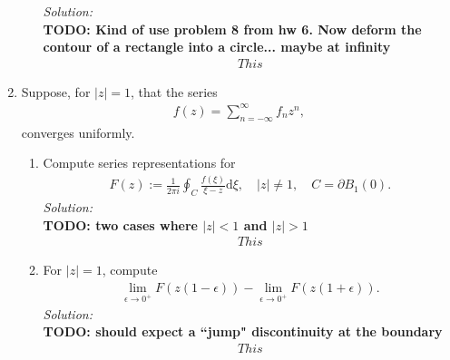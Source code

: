 \documentclass[10pt]{amsart}
\newcommand{\D}{\mathrm{d}}
\theoremstyle{nonumberplain}
\begin{document}
\begin{enumerate}[label={\bf {\arabic*}:}]
\begin{enumerate}
\noindent
\textit{Solution:} \\
\textbf{TODO: Kind of use problem 8 from hw 6. Now deform the contour of a rectangle into a circle... maybe at infinity}
\begin{align*}
This
\end{align*}
\end{enumerate}
\newpage

\item Suppose, for $|z| = 1$, that the series
\begin{align*}
f(z) = \sum_{n = -\infty}^\infty f_n z^n,
\end{align*}
converges uniformly.
\begin{enumerate}
\item Compute series representations for
\begin{align*}
F(z) := \frac{1}{2 \pi i} \oint_{C} \frac{f(\xi)}{\xi - z} \D \xi,
\quad |z| \neq 1, \quad C = \partial B_1(0).
\end{align*}
\textit{Solution:} \\
\textbf{TODO: two cases where $|z| < 1$ and $|z| > 1$}
\begin{align*}
This
\end{align*}

\item For $|z| = 1$, compute
\begin{align*}
\lim_{\epsilon \to 0^+} F( z(1 - \epsilon)) -       \lim_{\epsilon \to 0^+} F( z(1 + \epsilon)) .
\end{align*}
\textit{Solution:} \\
\textbf{TODO: should expect a ``jump" discontinuity at the boundary}
\begin{align*}
This
\end{align*}

\end{enumerate}
\end{enumerate}
\end{document}
